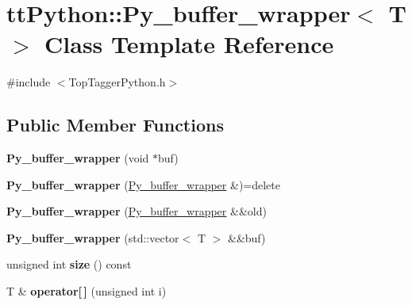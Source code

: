 \hypertarget{classttPython_1_1Py__buffer__wrapper}{\section{tt\-Python\-:\-:Py\-\_\-buffer\-\_\-wrapper$<$ T $>$ Class Template Reference}
\label{classttPython_1_1Py__buffer__wrapper}
}


{\ttfamily \#include $<$Top\-Tagger\-Python.\-h$>$}

\subsection*{Public Member Functions}
\begin{DoxyCompactItemize}
\item 
\hypertarget{classttPython_1_1Py__buffer__wrapper_a56901c5eaa03f74d09575553ba694c02}{{\bfseries Py\-\_\-buffer\-\_\-wrapper} (void $\ast$buf)}\label{classttPython_1_1Py__buffer__wrapper_a56901c5eaa03f74d09575553ba694c02}

\item 
\hypertarget{classttPython_1_1Py__buffer__wrapper_a18101320c66c7c066866e6fda8e41116}{{\bfseries Py\-\_\-buffer\-\_\-wrapper} (\hyperlink{classttPython_1_1Py__buffer__wrapper}{Py\-\_\-buffer\-\_\-wrapper} \&)=delete}\label{classttPython_1_1Py__buffer__wrapper_a18101320c66c7c066866e6fda8e41116}

\item 
\hypertarget{classttPython_1_1Py__buffer__wrapper_aed14786291095cbd9aa1fd3c5f68ac1a}{{\bfseries Py\-\_\-buffer\-\_\-wrapper} (\hyperlink{classttPython_1_1Py__buffer__wrapper}{Py\-\_\-buffer\-\_\-wrapper} \&\&old)}\label{classttPython_1_1Py__buffer__wrapper_aed14786291095cbd9aa1fd3c5f68ac1a}

\item 
\hypertarget{classttPython_1_1Py__buffer__wrapper_a7ba53310e416a8b8a0ff56ca1568ba0b}{{\bfseries Py\-\_\-buffer\-\_\-wrapper} (std\-::vector$<$ T $>$ \&\&buf)}\label{classttPython_1_1Py__buffer__wrapper_a7ba53310e416a8b8a0ff56ca1568ba0b}

\item 
\hypertarget{classttPython_1_1Py__buffer__wrapper_a025070123ca2b75de184c42cbca24fc6}{unsigned int {\bfseries size} () const }\label{classttPython_1_1Py__buffer__wrapper_a025070123ca2b75de184c42cbca24fc6}

\item 
\hypertarget{classttPython_1_1Py__buffer__wrapper_a738aaf24bd0d1e52e559039e62cab787}{T \& {\bfseries operator\mbox{[}$\,$\mbox{]}} (unsigned int i)}\label{classttPython_1_1Py__buffer__wrapper_a738aaf24bd0d1e52e559039e62cab787}


\end{DoxyCompactItemize}
